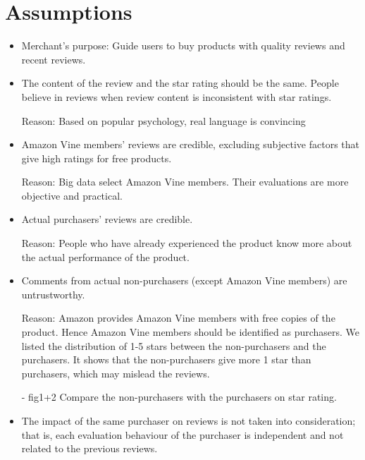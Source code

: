 \documentclass{mcmthesis}
\begin{document}
\section{ Assumptions }
\begin{itemize}
  \item Merchant's purpose: Guide users to buy products with quality reviews and recent reviews.
\end{itemize}
\begin{itemize}
  \item The content of the review and the star rating should be the same. People believe in reviews when review content is inconsistent with star ratings.

Reason: Based on popular psychology, real language is convincing 
\end{itemize}
\begin{itemize}
  \item Amazon Vine members' reviews are credible, excluding subjective factors that give high ratings for free products.

Reason: Big data select Amazon Vine members. Their evaluations are more objective and practical.
\end{itemize}
\begin{itemize}
  \item Actual purchasers' reviews are credible.

Reason: People who have already experienced the product know more about the actual performance of the product.
\end{itemize}
\begin{itemize}
  \item Comments from actual non-purchasers (except Amazon Vine members) are untrustworthy.

Reason: Amazon provides Amazon Vine members with free copies of the product. Hence Amazon Vine members should be identified as purchasers. We listed the distribution of 1-5 stars between the non-purchasers and the purchasers. It shows that the non-purchasers give more 1 star than purchasers, which may mislead the reviews.

- fig1+2 Compare the non-purchasers with the purchasers on star rating.
\end{itemize}
\begin{itemize}
  \item The impact of the same purchaser on reviews is not taken into consideration; that is, each evaluation behaviour of the purchaser is independent and not related to the previous reviews.
\end{itemize}
\end{document}
